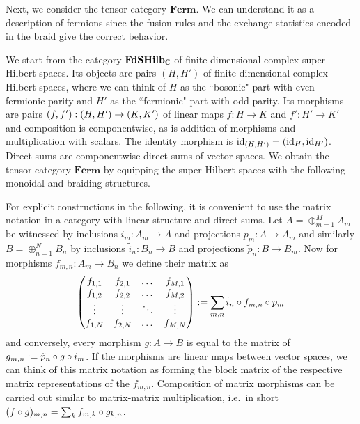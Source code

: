 \newcommand{\tfermpair}[2]{(#1, #2)}
\newcommand{\fermpair}[2]{\rBr{#1, #2}}

Next, we consider the tensor category $\mathbf{Ferm}$.
%
We can understand it as a description of fermions since the fusion rules and the exchange statistics encoded in the braid give the correct behavior.

We start from the category $\mathbf{FdSHilb}_{\mathbb{C}}$ of finite dimensional complex super Hilbert spaces.
%
Its objects are pairs $\tfermpair{H}{H'}$ of finite dimensional complex Hilbert spaces, where we can think of $H$ as the ``bosonic" part with even fermionic parity and $H'$ as the ``fermionic" part with odd parity.
%
Its morphisms are pairs $\fermpair{f}{f'}: \fermpair{H}{H'} \to \fermpair{K}{K'}$ of linear maps $f: H \to K$ and $f':H' \to K'$ and composition is componentwise, as is addition of morphisms and multiplication with scalars.
%
The identity morphism is $\id{\fermpair{H}{H'}} = \fermpair{\id{H}}{\id{H'}}$.
%
Direct sums are componentwise direct sums of vector spaces.
%
We obtain the tensor category $\mathbf{Ferm}$ by equipping the super Hilbert spaces with the following monoidal and braiding structures.

For explicit constructions in the following, it is convenient to use the matrix notation in a category with linear structure and direct sums.
%
Let $A = \oplus_{m=1}^M A_m$ be witnessed by inclusions $i_m: A_m \to A$ and projections $p_m: A \to A_m$ and similarly $B = \oplus_{n=1}^N B_n$ by inclusions $\tilde{i}_n: B_n \to B$ and projections $\tilde{p}_n: B \to B_m$.
%
Now for morphisms $f_{m,n} : A_m \to B_n$ we define their matrix as
\begin{equation}
    \begin{pmatrix}
        f_{1,1} & f_{2,1} & \dots & f_{M,1} \\
        f_{1,2} & f_{2,2} & \dots & f_{M,2} \\
        \vdots & \vdots & \ddots & \vdots \\
        f_{1,N} & f_{2,N} & \dots & f_{M,N}
    \end{pmatrix}
    := \sum_{m,n} \tilde{i}_n \circ f_{m,n} \circ p_m
\end{equation}
and conversely, every morphism $g : A \to B$ is equal to the matrix of $g_{m,n} := \tilde{p}_n \circ g \circ i_m$.
%
If the morphisms are linear maps between vector spaces, we can think of this matrix notation as forming the block matrix of the respective matrix representations of the $f_{m,n}$.
%
Composition of matrix morphisms can be carried out similar to matrix-matrix multiplication, i.e.~in short $(f \circ g)_{m,n} = \sum_k f_{m,k} \circ g_{k,n}$.


